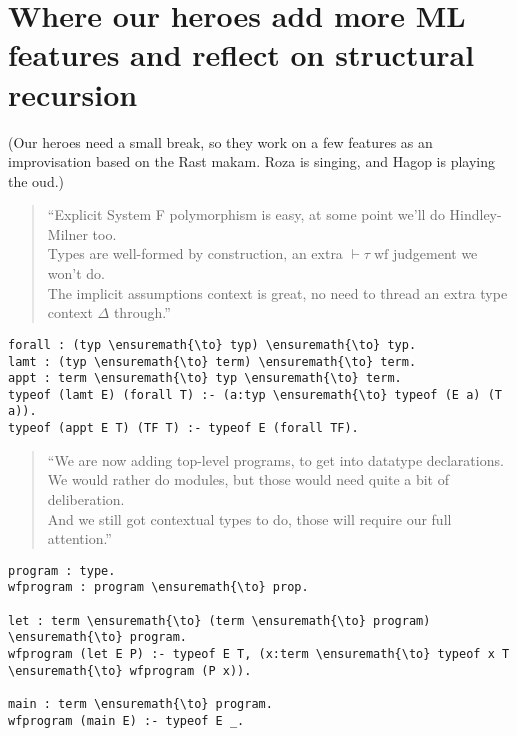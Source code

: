 \section{Where our heroes add more ML features and reflect on structural
recursion}\label{where-our-heroes-add-more-ml-features-and-reflect-on-structural-recursion}

\begin{scenecomment}
(Our heroes need a small break, so they work on a few features as an improvisation based on the Rast makam. Roza is singing, and Hagop is playing the oud.)
\end{scenecomment}

\begin{verse}
``Explicit System F polymorphism is easy, at some point we'll do Hindley-Milner too. \\
Types are well-formed by construction, an extra $\vdash \tau \; \text{wf}$ judgement we won't do. \\
The implicit assumptions context is great, no need to thread an extra type context $\Delta$ through.''
\end{verse}

\begin{verbatim}
forall : (typ \ensuremath{\to} typ) \ensuremath{\to} typ.
lamt : (typ \ensuremath{\to} term) \ensuremath{\to} term.
appt : term \ensuremath{\to} typ \ensuremath{\to} term.
typeof (lamt E) (forall T) :- (a:typ \ensuremath{\to} typeof (E a) (T a)).
typeof (appt E T) (TF T) :- typeof E (forall TF).
\end{verbatim}

\begin{verse}
``We are now adding top-level programs, to get into datatype declarations. \\
We would rather do modules, but those would need quite a bit of deliberation. \\
And we still got contextual types to do, those will require our full attention.''
\end{verse}

\begin{verbatim}
program : type.
wfprogram : program \ensuremath{\to} prop.

let : term \ensuremath{\to} (term \ensuremath{\to} program) \ensuremath{\to} program.
wfprogram (let E P) :- typeof E T, (x:term \ensuremath{\to} typeof x T \ensuremath{\to} wfprogram (P x)).

main : term \ensuremath{\to} program.
wfprogram (main E) :- typeof E _.
\end{verbatim}

